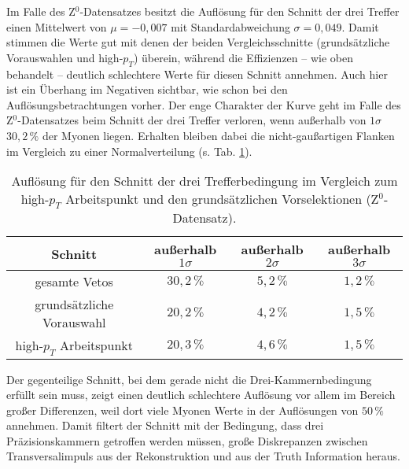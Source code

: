 Im Falle des Z$^0$-Datensatzes besitzt die Auflösung für den Schnitt der drei Tref\-fer einen Mittelwert von $\mu=-0,007$ mit Standardabweichung $\sigma =0,049$. Damit stimmen die Werte gut mit denen der beiden Vergleichsschnitte (grundsätzliche Vor\-auswahlen und high-$p_T$) überein, während die Effizienzen -- wie oben behandelt -- deutlich schlechtere Werte für diesen Schnitt annehmen. Auch hier ist ein Überhang im Negativen sichtbar, wie schon bei den Auflösungsbetrachtungen vorher.
Der enge Charakter der Kurve geht im Falle des Z$^0$-Datensatzes beim Schnitt der drei Tref\-fer verloren, wenn außerhalb von $1\sigma$ $30,2\,\%$ der Myonen liegen. Erhalten bleiben dabei die nicht-gaußartigen Flanken im Vergleich zu einer Normalverteilung (s. Tab. \ref{123sigmaIndiv4Z}). 
\begin{table}[htbp]
		\centering
		\begin{tabular*}{\linewidth}{@{\extracolsep{\fill}}cccc}
		\hline
		\hline
		\rule[-7pt]{0pt}{23pt} Schnitt & außerhalb $1\sigma$ & außerhalb $2\sigma$ & außerhalb $3\sigma$
		\\
		\hline
		\rule[-6pt]{0pt}{21pt} gesamte Vetos               & \(30,2\,\%\) & $5,2\,\%$ & $1,2\,\%$
		\\
		\rule[-6pt]{0pt}{21pt} grundsätzliche Vorauswahl   &  \(20,2\,\%\)	& $4,2\,\%$ & $1,5\,\%$
		\\
		\rule[-6pt]{0pt}{21pt} high-$p_T$ Arbeitspunkt     &  \(20,3\,\%\)	& $4,6\,\%$ & $1,5\,\%$
		\\
		\hline
		\hline
		\end{tabular*}
		\caption[Auflösung für den Schnitt der drei Trefferbedingung für den Z$^0$-Datensatz]{Auflösung für den Schnitt der drei Trefferbedingung im Vergleich zum high-$p_T$ Arbeitspunkt und den grundsätzlichen Vorselektionen (Z$^0$-Datensatz).}
		\label{123sigmaIndiv4Z}
	\end{table} 	
Der gegenteilige Schnitt, bei dem gerade nicht die Drei-Kammernbedingung erfüllt sein muss, zeigt einen deutlich schlechtere Auflösung vor allem im Bereich großer Differenzen, weil dort viele Myonen Werte in der Auflösungen von $50\,\%$ annehmen. Damit filtert der Schnitt mit der Bedingung, dass drei Präzisionskammern getroffen werden müssen, große Diskrepanzen zwischen Transversalimpuls aus der Rekonstruktion und aus der Truth Information heraus. 
